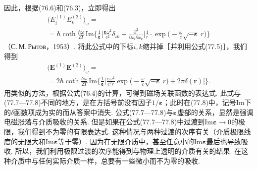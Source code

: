 因此，根据(76.6)和(76.3)，立即得出
\begin{equation}
\begin{aligned}
\bigl(E_{i}^{(1)}E_{k}^{(2)}\bigr)_{\omega}={}\\
{}=\hbar\coth\frac{\hbar\omega}{2T}\,\mathrm{Im}\Biggl\{\frac{1}{\bm{\varepsilon}}
\biggl[\frac{\bm{\varepsilon}\omega^{2}}{c^{2}}\delta_{ik}+\frac{\partial^{2}}{\partial x_{i}\partial x_{k}}\biggr]\frac{1}{r}\cdot\exp\biggl(-\frac{\omega}{c}\sqrt{-\bm{\varepsilon}}\,r\biggr)\Biggr\}
\end{aligned}
\end{equation}
（С.\,М.\,Рытов，1953）. 将此公式中的下标$i,k$缩并掉［并利用公式(77.5)］，我们得到
\begin{equation}
\begin{aligned}
\bigl(\bm{E}^{(1)}\bm{E}^{(2)}\bigr)_{\omega}={}\\
{}=2\hbar\coth\frac{\hbar\omega}{2T}\,\mathrm{Im}\Biggl\{\frac{1}{\bm{\varepsilon}}
\biggl[\frac{\bm{\varepsilon}\omega^{2}}{c^{2}r}\exp\biggl(-\frac{\omega}{c}\sqrt{-\bm{\varepsilon}}\,r\biggr)+2\pi\delta(\bm{r})\biggr]\Biggr\}.
\end{aligned}
\end{equation}
用类似的方法，根据公式(76.4)的计算，可得到磁场关联函数的表达式. 此式与(77.7—77.8)不同的地方，是在方括号前没有因子$1/\bm{\varepsilon}$；此时在(77.8)中，记号$\mathrm{Im}$下的$\delta$函数项成为实的而从答案中消失. 公式(77.7—77.8)与$\bm{\varepsilon}$虚部的关系，显然是强调电磁涨落与介质吸收的关系. 但是如果在公式(77.7—77.8)中过渡到$\mathrm{Im}\bm{\varepsilon}\to0$的极限，我们得到不为零的有限表达式. 这种情况与两种过渡的次序有关（介质极限线度的无限大和$\mathrm{Im}\bm{\varepsilon}$等于零）. 因为在无限介质中，甚至任意小的$\mathrm{Im}\bm{\varepsilon}$最后也导致吸收. 所以，我们利用极限过渡的次序能得到与物理上透明的介质有关的结果. 在这种介质中与任何实际介质一样，总要有一些微小而不为零的吸收.

